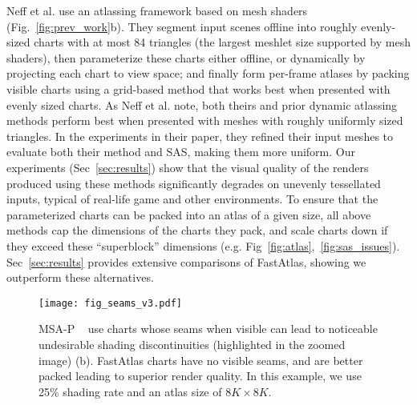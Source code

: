 Neff et al.  use an atlassing framework based on mesh shaders (Fig.~\ref{fig:prev_work}b).
They segment input scenes offline into roughly evenly-sized charts with at most 84 triangles (the largest meshlet size supported by mesh shaders), then parameterize these charts either offline, or dynamically by projecting each chart to view space; and finally form per-frame atlases by packing visible charts using a grid-based method that works best when presented with evenly sized charts. 
As Neff et al. note, both theirs and prior dynamic atlassing methods \cite{mueller2018shading,hladky2019tessellated} perform best when presented with meshes with roughly uniformly sized triangles. In the experiments in their paper, they refined their input meshes to evaluate both their method and SAS, making them more uniform. Our experiments (Sec~\ref{sec:results}) show that the visual quality of the renders produced using these methods significantly degrades on unevenly tessellated inputs, typical of real-life game and other environments. 
To ensure that the parameterized charts can be packed into an atlas of a given size, all above methods  \cite{mueller2018shading,hladky2019tessellated,hladky2021snakebinning,Neff2022MSA} cap the dimensions of the charts they pack, and scale charts down if they exceed these ``superblock'' dimensions (e.g. Fig~\ref{fig:atlas},~\ref{fig:sas_issues}). Sec~\ref{sec:results} provides extensive comparisons of FastAtlas, showing we outperform these alternatives. 

\begin{figure}
\texttt{[image: fig\_seams\_v3.pdf]}
\caption{MSA-P ~\cite{Neff2022MSA} use charts whose seams when visible can lead to noticeable undesirable shading discontinuities (highlighted in the zoomed image)  (b). FastAtlas charts have no visible seams, and are better packed leading to superior render quality. In this example, we use 25\% shading rate and an atlas size of $8K \times 8K$.}
\label{fig:seams}
\vspace{-5mm}
\end{figure}

